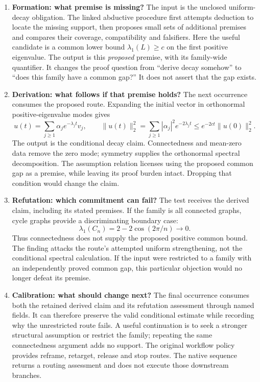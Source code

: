 \begin{enumerate}[leftmargin=*]
\item \textbf{Formation: what premise is missing?}
The input is the unclosed uniform-decay obligation. The linked abductive procedure
first attempts deduction to locate the missing support, then proposes small sets
of additional premises and compares their coverage, compatibility and falsifiers.
Here the useful candidate is a common lower bound $\lambda_1(L)\geq c$ on the
first positive eigenvalue. The output is this \emph{proposed} premise, with its
family-wide quantifier. It changes the proof question from ``derive decay somehow''
to ``does this family have a common gap?'' It does not assert that the gap exists.

\item \textbf{Derivation: what follows if that premise holds?}
The next occurrence consumes the proposed route. Expanding the initial vector in
orthonormal positive-eigenvalue modes gives
\[
 u(t)=\sum_{j\geq1}\alpha_j e^{-\lambda_jt}v_j,
 \qquad
 \|u(t)\|_2^2=\sum_{j\geq1}|\alpha_j|^2e^{-2\lambda_jt}
 \leq e^{-2ct}\|u(0)\|_2^2.
\]
The output is the conditional decay claim. Connectedness and mean-zero data remove
the zero mode; symmetry supplies the orthonormal spectral decomposition. The
assumption relation licenses using the proposed common gap as a premise, while
leaving its proof burden intact. Dropping that condition would change the claim.

\item \textbf{Refutation: which commitment can fail?}
The test receives the derived claim, including its stated premises. If the family
is all connected graphs, cycle graphs provide a discriminating boundary case:
\[
 \lambda_1(C_n)=2-2\cos(2\pi/n)\longrightarrow0.
\]
Thus connectedness does not supply the proposed positive common bound. The finding
attacks the route's attempted uniform strengthening, not the conditional spectral
calculation. If the input were restricted to a family with an independently proved
common gap, this particular objection would no longer defeat its premise.

\item \textbf{Calibration: what should change next?}
The final occurrence consumes both the retained derived claim and its refutation
assessment through named fields. It can therefore preserve the valid conditional
estimate while recording why the unrestricted route fails. A useful continuation
is to seek a stronger structural assumption or restrict the family; repeating the
same connectedness argument adds no support. The original workflow policy provides
reframe, retarget, release and stop routes. The native sequence returns a routing
assessment and does not execute those downstream branches.
\end{enumerate}

